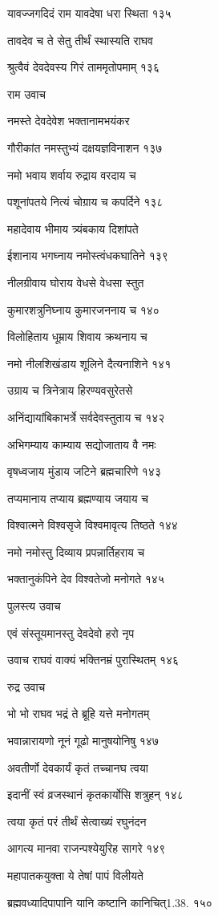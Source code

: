 यावज्जगदिदं राम यावदेषा धरा स्थिता १३५

तावदेव च ते सेतु तीर्थं स्थास्यति राघव

श्रुत्वैवं देवदेवस्य गिरं ताममृतोपमाम् १३६

राम उवाच

नमस्ते देवदेवेश भक्तानामभयंकर

गौरीकांत नमस्तुभ्यं दक्षयज्ञविनाशन १३७

नमो भवाय शर्वाय रुद्राय वरदाय च

पशूनांपतये नित्यं चोग्राय च कपर्दिने १३८

महादेवाय भीमाय त्र्यंबकाय दिशांपते

ईशानाय भगघ्नाय नमोस्त्वंधकघातिने १३९

नीलग्रीवाय घोराय वेधसे वेधसा स्तुत

कुमारशत्रुनिघ्नाय कुमारजननाय च १४०

विलोहिताय धूम्राय शिवाय क्रथनाय च

नमो नीलशिखंडाय शूलिने दैत्यनाशिने १४१

उग्राय च त्रिनेत्राय हिरण्यवसुरेतसे

अनिंद्यायांबिकाभर्त्रे सर्वदेवस्तुताय च १४२

अभिगम्याय काम्याय सद्योजाताय वै नमः

वृषध्वजाय मुंडाय जटिने ब्रह्मचारिणे १४३

तप्यमानाय तप्याय ब्रह्मण्याय जयाय च

विश्वात्मने विश्वसृजे विश्वमावृत्य तिष्ठते १४४

नमो नमोस्तु दिव्याय प्रपन्नार्तिहराय च

भक्तानुकंपिने देव विश्वतेजो मनोगते १४५

पुलस्त्य उवाच

एवं संस्तूयमानस्तु देवदेवो हरो नृप

उवाच राघवं वाक्यं भक्तिनम्रं पुरास्थितम् १४६

रुद्र उवाच

भो भो राघव भद्रं ते ब्रूहि यत्ते मनोगतम्

भवान्नारायणो नूनं गूढो मानुषयोनिषु १४७

अवतीर्णो देवकार्यं कृतं तच्चानघ त्वया

इदानीं स्वं व्रजस्थानं कृतकार्योसि शत्रुहन् १४८

त्वया कृतं परं तीर्थं सेत्वाख्यं रघुनंदन

आगत्य मानवा राजन्पश्येयुरिह सागरे १४९

महापातकयुक्ता ये तेषां पापं विलीयते

ब्रह्मवध्यादिपापानि यानि कष्टानि कानिचित्1.38. १५०

